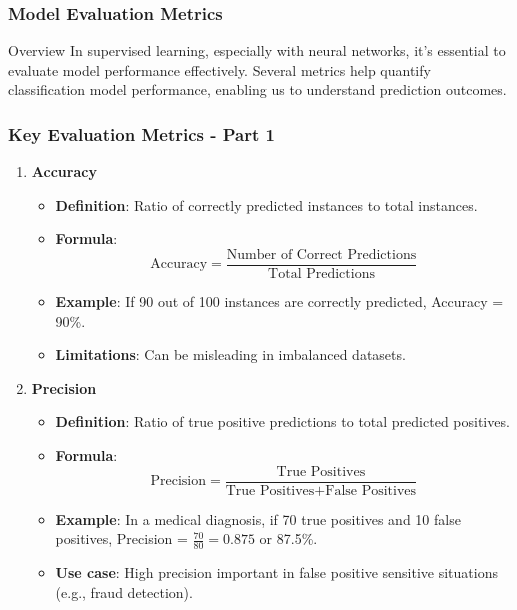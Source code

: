 \documentclass[aspectratio=169]{beamer}
\begin{document}
\begin{frame}[fragile]
    \frametitle{Model Evaluation Metrics}
    \begin{block}{Overview}
        In supervised learning, especially with neural networks, it’s essential to evaluate model performance effectively. 
        Several metrics help quantify classification model performance, enabling us to understand prediction outcomes.
    \end{block}
\end{frame}

\begin{frame}[fragile]
    \frametitle{Key Evaluation Metrics - Part 1}
    \begin{enumerate}
        \item \textbf{Accuracy}
        \begin{itemize}
            \item \textbf{Definition}: Ratio of correctly predicted instances to total instances.
            \item \textbf{Formula}:
            \begin{equation}
                \text{Accuracy} = \frac{\text{Number of Correct Predictions}}{\text{Total Predictions}} 
            \end{equation}
            \item \textbf{Example}: If 90 out of 100 instances are correctly predicted, Accuracy = 90\%.
            \item \textbf{Limitations}: Can be misleading in imbalanced datasets.
        \end{itemize}
        
        \item \textbf{Precision}
        \begin{itemize}
            \item \textbf{Definition}: Ratio of true positive predictions to total predicted positives.
            \item \textbf{Formula}:
            \begin{equation}
                \text{Precision} = \frac{\text{True Positives}}{\text{True Positives} + \text{False Positives}} 
            \end{equation}
            \item \textbf{Example}: In a medical diagnosis, if 70 true positives and 10 false positives,  
            Precision = \( \frac{70}{80} = 0.875 \) or 87.5\%.
            \item \textbf{Use case}: High precision important in false positive sensitive situations (e.g., fraud detection).
        \end{itemize}
    \end{enumerate}
\end{frame}
\end{document}
